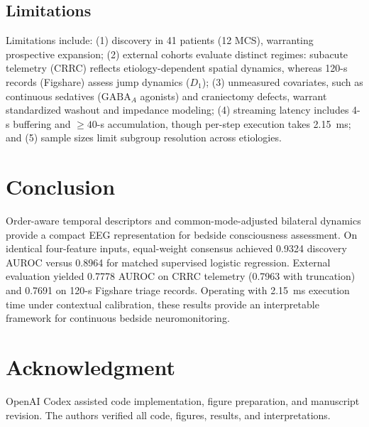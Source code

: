 \documentclass[journal,twoside,web]{ieeecolor}
\begin{document}
\vspace{-4pt}
\subsection{Limitations}
Limitations include: (1) discovery in 41 patients (12 MCS), warranting prospective expansion; (2) external cohorts evaluate distinct regimes: subacute telemetry (CRRC) reflects etiology-dependent spatial dynamics, whereas 120-s records (Figshare) assess jump dynamics ($D_1$); (3) unmeasured covariates, such as continuous sedatives ($\text{GABA}_A$ agonists) and craniectomy defects, warrant standardized washout and impedance modeling; (4) streaming latency includes 4-s buffering and $\ge 40$-s accumulation, though per-step execution takes 2.15~ms; and (5) sample sizes limit subgroup resolution across etiologies.

\vspace{-6pt}

\section{Conclusion}
Order-aware temporal descriptors and common-mode-adjusted bilateral dynamics provide a compact EEG representation for bedside consciousness assessment. On identical four-feature inputs, equal-weight consensus achieved 0.9324 discovery AUROC versus 0.8964 for matched supervised logistic regression. External evaluation yielded 0.7778 AUROC on CRRC telemetry (0.7963 with truncation) and 0.7691 on 120-s Figshare triage records. Operating with 2.15~ms execution time under contextual calibration, these results provide an interpretable framework for continuous bedside neuromonitoring.

\vspace{-4pt}
\section*{Acknowledgment}
\vspace{-2pt}
OpenAI Codex assisted code implementation, figure preparation, and manuscript revision. The authors verified all code, figures, results, and interpretations.

\vspace{-4pt}
\end{document}
